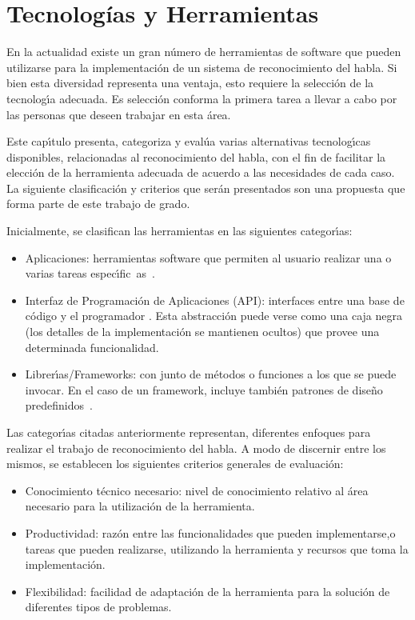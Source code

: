  \chapter{Tecnolog\'ias y Herramientas}
\label{sec:tecnologias}

En la actualidad existe un gran n\'umero de herramientas de software que pueden utilizarse para la implementaci\'on de un
sistema de reconocimiento del habla. Si bien esta diversidad representa una ventaja, esto requiere
la selecci\'on de la tecnolog{\'\i}a adecuada. Es selecci\'on conforma la primera tarea a llevar a
cabo por las personas que deseen trabajar en esta \'area.

Este cap{\'\i}tulo presenta, categoriza y eval\'ua varias alternativas tecnolog{\'\i}cas disponibles, relacionadas
al reconocimiento del habla, con el fin de facilitar la elecci\'on de la herramienta adecuada
de acuerdo a las necesidades de cada caso. La siguiente clasificaci\'on y criterios que ser\'an presentados son
una propuesta que forma parte de este trabajo de grado.

Inicialmente, se clasifican las herramientas en las siguientes categor{\'\i}as:
\begin{itemize}
	\item Aplicaciones: herramientas software que permiten al usuario realizar una o
	varias tareas \mbox{espec{\'\i}fic as \cite{GoodwillComputer}}.
	\item Interfaz de Programaci\'on de  Aplicaciones (API): interfaces entre una base de c\'odigo y
	el programador \cite{DoucetteOnApi}. Esta abstracci\'on puede verse como una caja negra
	(los detalles de la implementaci\'on se mantienen ocultos) que provee una determinada funcionalidad.
	\item Librer{\'\i}as/Frameworks: con junto de m\'etodos o funciones a los que se puede invocar.
	En el caso de un framework, incluye tambi\'en patrones de dise\~no
	\mbox{predefinidos \cite{FowlerInversion}}.
\end{itemize}

Las categor{\'\i}as citadas anteriormente representan, diferentes enfoques para realizar el trabajo
de reconocimiento del habla. A modo de discernir entre los mismos, se establecen
los siguientes criterios generales de evaluaci\'on:
\begin{itemize}
	\item Conocimiento t\'ecnico necesario: nivel de conocimiento relativo al \'area necesario para la
	utilizaci\'on de la herramienta. 
	\item Productividad: raz\'on entre las funcionalidades que pueden implementarse,o tareas que pueden
	realizarse, utilizando la herramienta y recursos que toma la implementaci\'on.
	\item Flexibilidad: facilidad de adaptaci\'on de la herramienta para la soluci\'on de diferentes
	tipos de problemas.
\end{itemize}

